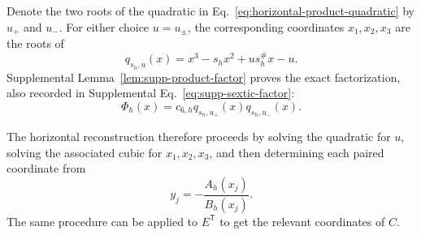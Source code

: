 Denote the two roots of the quadratic in Eq.~\ref{eq:horizontal-product-quadratic} by $u_+$ and $u_-$. For either choice $u=u_\pm$, the corresponding coordinates $x_1,x_2,x_3$ are the roots of
\begin{equation}
q_{s_h,u}(x)=x^3-s_hx^2+us_h^\#x-u.
\label{eq:horizontal-coordinate-cubic}
\end{equation}
Supplemental Lemma~\ref{lem:supp-product-factor} proves the exact factorization,
also recorded in Supplemental Eq.~\eqref{eq:supp-sextic-factor}:
\begin{equation}
\Phi_h(x)=c_{6,h}q_{s_h,u_+}(x)q_{s_h,u_-}(x).
\end{equation}

The horizontal reconstruction therefore proceeds by solving the quadratic for $u$, solving the associated cubic for $x_1,x_2,x_3$, and then determining each paired coordinate from
\begin{equation}
y_j=-\frac{A_h(x_j)}{B_h(x_j)}.
\end{equation}
The same procedure can be applied to $E^{\mathsf T}$ to get the relevant coordinates of $C$. 

